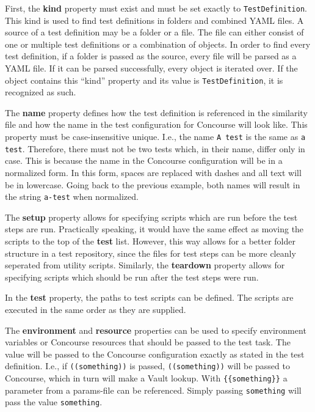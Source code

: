 First, the \textbf{kind} property must exist and must be set exactly to \verb|TestDefinition|.
This kind is used to find test definitions in folders and combined YAML files.
A source of a test definition may be a folder or a file.
The file can either consist of one or multiple test definitions or a combination of objects.
In order to find every test definition, if a folder is passed as the source, every file will be parsed as a YAML file.
If it can be parsed successfully, every object is iterated over.
If the object contains this ``kind'' property and its value is \verb|TestDefinition|, it is recognized as such.

The \textbf{name} property defines how the test definition is referenced in the similarity file and how the name in the test configuration for Concourse will look like.
This property must be case-insensitive unique.
I.e., the name \verb|A test| is the same as \verb|a test|.
Therefore, there must not be two tests which, in their name, differ only in case.
This is because the name in the Concourse configuration will be in a normalized form.
In this form, spaces are replaced with dashes and all text will be in lowercase.
Going back to the previous example, both names will result in the string \verb|a-test| when normalized.

\pagebreak

The \textbf{setup} property allows for specifying scripts which are run before the test steps are run.
Practically speaking, it would have the same effect as moving the scripts to the top of the \textbf{test} list.
However, this way allows for a better folder structure in a test repository, since the files for test steps can be more cleanly seperated from utility scripts.
Similarly, the \textbf{teardown} property allows for specifying scripts which should be run after the test steps were run.

In the \textbf{test} property, the paths to test scripts can be defined.
The scripts are executed in the same order as they are supplied.

The \textbf{environment} and \textbf{resource} properties can be used to specify environment variables or Concourse resources that should be passed to the test task.
The value will be passed to the Concourse configuration exactly as stated in the test definition.
I.e., if \verb|((something))| is passed, \verb|((something))| will be passed to Concourse, which in turn will make a Vault lookup.
With \verb|{{something}}| a parameter from a params-file can be referenced.
Simply passing \verb|something| will pass the value \verb|something|.

